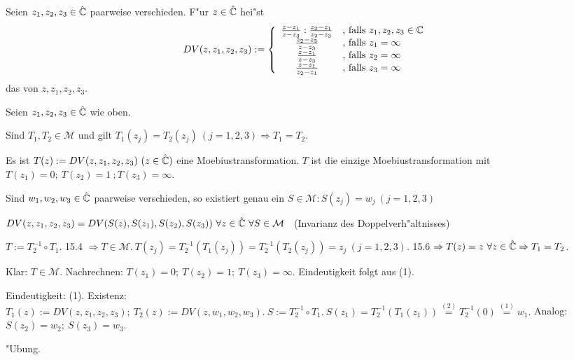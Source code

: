 \documentclass[a4paper,twoside,DIV15,BCOR12mm]{scrbook}
\begin{document}
\begin{definition}
Seien $z_1,z_2,z_3 \in \hat{\mathbb{C}}$ paarweise verschieden. F"ur $z \in \hat{\mathbb{C}}$ hei"st
\[
DV(z,z_1,z_2,z_3) := \left\{
\begin{array}{cl}
\frac{z-z_1}{z-z_3}:\frac{z_2-z_1}{z_2-z_3} & \mbox{, falls } z_1,z_2,z_3 \in \mathbb{C} \\
\frac{z_2-z_3}{z-z_3} & \mbox{, falls } z_1 = \infty \\
\frac{z-z_1}{z-z_3} & \mbox{, falls } z_2 = \infty \\
\frac{z-z_1}{z_2-z_1} & \mbox{, falls } z_3 = \infty
\end{array} \right.
\]
das  von $z,z_1,z_2,z_3$.
\end{definition}

\begin{satz}
Seien $z_1,z_2,z_3 \in \hat{\mathbb{C}}$ wie oben.
\begin{liste}
\item Sind $T_1,T_2 \in \mathcal{M}$ und gilt $T_1(z_j) = T_2(z_j) \ (j=1,2,3) \Rightarrow T_1 = T_2.$
\item Es ist $T(z) := DV(z,z_1,z_2,z_3) \ (z \in \hat{\mathbb{C}})$ eine Moebiustransformation. $T$ ist die einzige Moebiustransformation mit $T(z_1)=0; \ T(z_2) = 1 \ ; T(z_3) = \infty$.
\item Sind $w_1,w_2,w_3 \in \hat{\mathbb{C}}$ paarweise verschieden, so existiert genau ein $S \in \mathcal{M}: S(z_j) = w_j \ (j = 1,2,3)$
\item $DV(z,z_1,z_2,z_3) = DV(S(z),S(z_1),S(z_2),S(z_3)) \ \forall z \in \hat{\mathbb{C}} \ \forall S \in \mathcal{M}$ \ (Invarianz des Doppelverh"altnisses)
\end{liste}
\end{satz}

\begin{beweis}
\begin{liste}
\item $T := T_2^{-1} \circ T_1.$ 15.4 $\Rightarrow T \in \mathcal{M}.\ T(z_j) = T_2^{-1}(T_1(z_j)) = T_2^{-1}(T_2(z_j)) = z_j \ (j=1,2,3).$ 15.6 $\Rightarrow T(z) = z \ \forall z \in \hat{\mathbb{C}} \Rightarrow T_1 = T_2$.
\item Klar: $T \in \mathcal{M}$. Nachrechnen: $T(z_1) = 0; \ T(z_2) = 1; \ T(z_3) = \infty$. Eindeutigkeit folgt aus (1).
\item Eindeutigkeit: (1). Existenz: $T_1(z):= DV(z,z_1,z_2,z_3); \ T_2(z) := DV(z,w_1,w_2,w_3).\ S:= T_2^{-1}\circ T_1.\ S(z_1) = T_2^{-1}(T_1(z_1)) \stackrel{(2)}{=} T_2^{-1}(0) \stackrel{(1)}{=} w_1.$ Analog: $S(z_2) = w_2; \ S(z_3) = w_3.$
\item "Ubung.
\end{liste}
\end{beweis}
\end{document}
